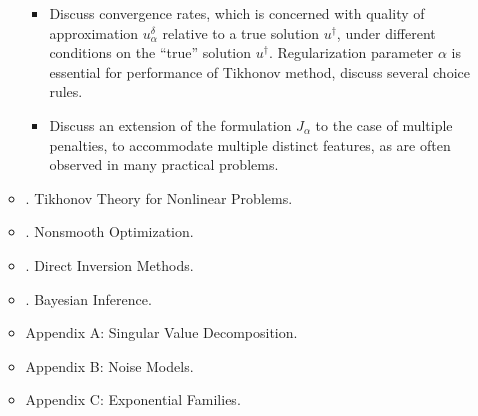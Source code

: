 \documentclass{article}
\begin{document}
\begin{enumerate}
\begin{itemize}
\begin{itemize}
			\item Discuss convergence rates, which is concerned with quality of approximation $u_\alpha^\delta$ relative to a true solution $u^\dagger$, under different conditions on the ``true'' solution $u^\dagger$. Regularization parameter $\alpha$ is essential for performance of Tikhonov method, discuss several choice rules.
			\item Discuss an extension of the formulation $J_\alpha$ to the case of multiple penalties, to accommodate multiple distinct features, as are often observed in many practical problems.
		\end{itemize}		
		
		\item {. Tikhonov Theory for Nonlinear Problems.}
		\item {. Nonsmooth Optimization.}
		\item {. Direct Inversion Methods.}
		\item {. Bayesian Inference.}
		\item {\sf Appendix A: Singular Value Decomposition.}
		\item {\sf Appendix B: Noise Models.}
		\item {\sf Appendix C: Exponential Families.}
	\end{itemize}
\end{enumerate}

\end{document}
